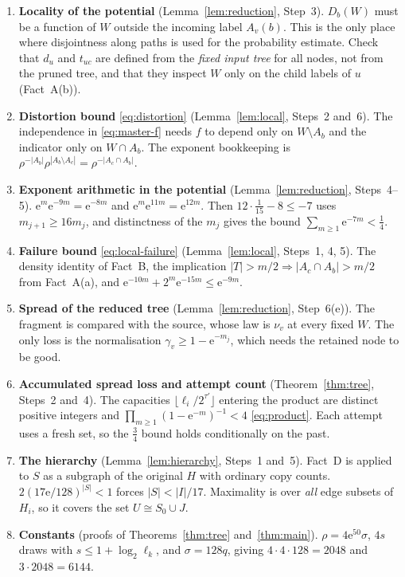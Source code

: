 \documentclass[11pt]{article}
\numberwithin{equation}{section}
\newcommand{\ee}{\mathrm e}
\begin{document}
\begin{enumerate}[leftmargin=2em,itemsep=4pt]
 \item \textbf{Locality of the potential} (Lemma~\ref{lem:reduction},
 Step~3). $D_b(W)$ must be a function of $W$ outside the incoming
 label $A_v(b)$. This is the only place where disjointness along paths
 is used for the probability estimate. Check that $d_u$ and $t_{uc}$
 are defined from the \emph{fixed input tree} for all nodes, not from
 the pruned tree, and that they inspect $W$ only on the child labels
 of $u$ (Fact~A(b)).
 \item \textbf{Distortion bound} \eqref{eq:distortion}
 (Lemma~\ref{lem:local}, Steps~2 and~6). The independence in
 \eqref{eq:master-f} needs $f$ to depend only on $W\setminus A_b$ and
 the indicator only on $W\cap A_b$. The exponent bookkeeping is
 $\rho^{-|A_b|}\rho^{|A_b\setminus A_c|}=\rho^{-|A_c\cap A_b|}$.
 \item \textbf{Exponent arithmetic in the potential}
 (Lemma~\ref{lem:reduction}, Steps~4--5).
 $\ee^{m}\ee^{-9m}=\ee^{-8m}$ and $\ee^{m}\ee^{11m}=\ee^{12m}$. Then
 $12\cdot\frac1{15}-8\le-7$ uses $m_{j+1}\ge16m_j$, and distinctness
 of the $m_j$ gives the bound $\sum_{m\ge1}\ee^{-7m}<\frac14$.
 \item \textbf{Failure bound} \eqref{eq:local-failure}
 (Lemma~\ref{lem:local}, Steps~1, 4, 5). The density identity of
 Fact~B, the implication
 $|T|>m/2\Rightarrow|A_c\cap A_b|>m/2$ from Fact~A(a), and
 $\ee^{-10m}+2^m\ee^{-15m}\le\ee^{-9m}$.
 \item \textbf{Spread of the reduced tree}
 (Lemma~\ref{lem:reduction}, Step~6(e)). The fragment is compared with
 the source, whose law is $\nu_v$ at every fixed $W$. The only loss is
 the normalisation $\gamma_v\ge1-\ee^{-m_j}$, which needs the retained
 node to be good.
 \item \textbf{Accumulated spread loss and attempt count}
 (Theorem~\ref{thm:tree}, Steps~2 and~4). The capacities
 $\lfloor\ell_i/2^{\tau'}\rfloor$ entering the product are distinct
 positive integers and $\prod_{m\ge1}(1-\ee^{-m})^{-1}<4$
 \eqref{eq:product}. Each attempt uses a fresh set, so the $\frac34$
 bound holds conditionally on the past.
 \item \textbf{The hierarchy} (Lemma~\ref{lem:hierarchy}, Steps~1
 and~5). Fact~D is applied to $S$ as a subgraph of the original $H$
 with ordinary copy counts. $2(17\ee/128)^{|S|}<1$ forces
 $|S|<|I|/17$. Maximality is over \emph{all} edge subsets of $H_i$, so
 it covers the set $U\cong S_0\cup J$.
 \item \textbf{Constants} (proofs of Theorems~\ref{thm:tree}
 and~\ref{thm:main}). $\rho=4\ee^{50}\sigma$, $4s$ draws with
 $s\le1+\log_2\ell_k$, and $\sigma=128q$, giving
 $4\cdot4\cdot128=2048$ and $3\cdot2048=6144$.
\end{enumerate}
\end{document}
